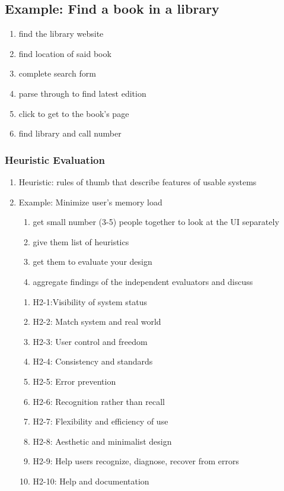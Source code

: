 \documentclass[11pt]{article}
\begin{document}
    \subsection{Example: Find a book in a library}

    \begin{enumerate}
        \item find the library website
        \item find location of said book
        \item complete search form
        \item parse through to find latest edition
        \item click to get to the book's page
        \item find library and call number
    \end{enumerate}

    \subsubsection{Heuristic Evaluation}
    \begin{enumerate}
        \item Heuristic: rules of thumb that describe features of usable systems
        \item Example: Minimize user's memory load
        \begin{enumerate}
            \item get small number (3-5) people together to look at the UI separately
            \item give them list of heuristics
            \item get them to evaluate your design 
            \item aggregate findings of the independent evaluators and discuss
        \end{enumerate}
        \begin{enumerate}
            \item H2-1:Visibility of system status 
            \item H2-2: Match system and real world
            \item H2-3: User control and freedom
            \item H2-4: Consistency and standards
            \item H2-5: Error prevention
            \item H2-6: Recognition rather than recall
            \item H2-7: Flexibility and efficiency of use
            \item H2-8: Aesthetic and minimalist design
            \item H2-9: Help users recognize, diagnose, recover from errors
            \item H2-10: Help and documentation
        \end{enumerate}
    \end{enumerate}
\end{document}
